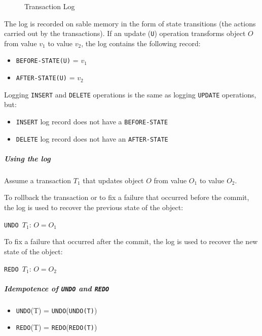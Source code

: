 \documentclass[english]{article}
\begin{document}
\begin{figure}[htbp]
  \centering
  \bigskip
  \caption{Transaction Log}
  \label{fig:transaction-log}
  \bigskip
\end{figure}

The log is recorded on sable memory in the form of state transitions (the actions carried out by the transactions).
If an update (\texttt{U}) operation transforms object \(O\) from value \(v_1\) to value \(v_2\), the log contains the following record:

\begin{itemize}
  \item \texttt{BEFORE-STATE(U)} = \(v_1\)
  \item \texttt{AFTER-STATE(U)} = \(v_2\)
\end{itemize}

Logging \texttt{INSERT} and \texttt{DELETE} operations is the same as logging \texttt{UPDATE} operations, but:

\begin{itemize}[label=\textbf{\texttt{>}}]
  \item \texttt{INSERT} log record does not have a \texttt{BEFORE-STATE}
  \item \texttt{DELETE} log record does not have an \texttt{AFTER-STATE}
\end{itemize}

\subparagraph*{Using the log}
Assume a transaction \(T_1\) that updates object \(O\) from value \(O_1\) to value \(O_2\).

To rollback the transaction or to fix a failure that occurred before the commit, the log is used to recover the previous state of the object:
\begin{center}
  \texttt{UNDO \(T_1\)}: \(O = O_1\)
\end{center}
To fix a failure that occurred after the commit, the log is used to recover the new state of the object:
\begin{center}
  \texttt{REDO \(T_1\)}: \(O = O_2\)
\end{center}

\subparagraph*{Idempotence of \texttt{UNDO} and \texttt{REDO}}

\begin{itemize}
  \item \texttt{UNDO}(T) = \texttt{UNDO}(\texttt{UNDO(T)})
  \item \texttt{REDO}(T) = \texttt{REDO}(\texttt{REDO(T)})
\end{itemize}
\end{document}
